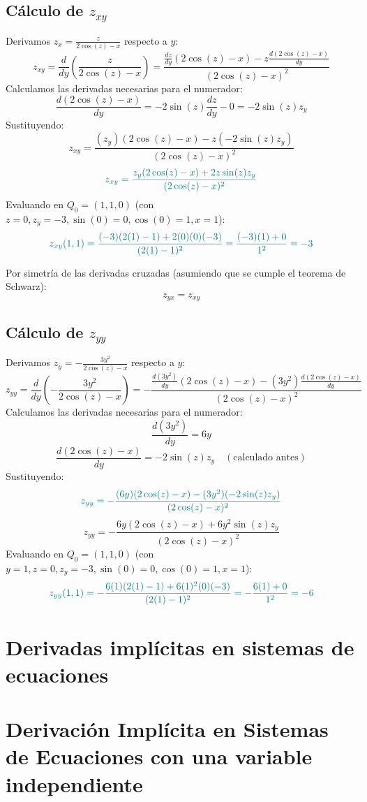 \documentclass{article}
\begin{document}
\subsection*{Cálculo de \( z_{xy} \)}
Derivamos \( z_x = \frac{z}{2\cos(z) - x} \) respecto a \( y \):
\[ z_{xy} = \frac{d}{dy}\left(\frac{z}{2\cos(z) - x}\right) = \frac{\frac{dz}{dy} (2\cos(z) - x) - z \frac{d(2\cos(z) - x)}{dy}}{(2\cos(z) - x)^2} \]
Calculamos las derivadas necesarias para el numerador:
\[ \frac{d(2\cos(z) - x)}{dy} = -2\sin(z) \frac{dz}{dy} - 0 = -2\sin(z) z_y \]
Sustituyendo:
\[ z_{xy} = \frac{(z_y)(2\cos(z) - x) - z(-2\sin(z) z_y)}{(2\cos(z) - x)^2} \]
\[\color{teal} z_{xy} = \frac{z_y(2\cos(z) - x) + 2z \sin(z) z_y}{(2\cos(z) - x)^2} \]
Evaluando en \( Q_0 = (1,1,0) \) (con \( z=0, z_y=-3, \sin(0)=0, \cos(0)=1, x=1 \)):
\[\color{teal} z_{xy}(1,1) = \frac{(-3)(2(1) - 1) + 2(0)(0)(-3)}{(2(1) - 1)^2} = \frac{(-3)(1) + 0}{1^2} = -3 \]


Por simetría de las derivadas cruzadas (asumiendo que se cumple el teorema de Schwarz):
\[
z_{yx} = z_{xy}
\]

\subsection*{Cálculo de \( z_{yy} \)}
Derivamos \( z_y = -\frac{3y^2}{2\cos(z) - x} \) respecto a \( y \):
\[ z_{yy} = \frac{d}{dy}\left(-\frac{3y^2}{2\cos(z) - x}\right) = - \frac{\frac{d(3y^2)}{dy} (2\cos(z) - x) - (3y^2) \frac{d(2\cos(z) - x)}{dy}}{(2\cos(z) - x)^2} \]
Calculamos las derivadas necesarias para el numerador:
\[ \frac{d(3y^2)}{dy} = 6y \]
\[ \frac{d(2\cos(z) - x)}{dy} = -2\sin(z) z_y \quad (\text{calculado antes}) \]
Sustituyendo:
\[\color{teal} z_{yy} = - \frac{(6y)(2\cos(z) - x) - (3y^2)(-2\sin(z) z_y)}{(2\cos(z) - x)^2} \]
\[ z_{yy} = - \frac{6y(2\cos(z) - x) + 6y^2 \sin(z) z_y}{(2\cos(z) - x)^2} \]
Evaluando en \( Q_0 = (1,1,0) \) (con \( y=1, z=0, z_y=-3, \sin(0)=0, \cos(0)=1, x=1 \)):
\[\color{teal} z_{yy}(1,1) = - \frac{6(1)(2(1) - 1) + 6(1)^2 (0) (-3)}{(2(1) - 1)^2} = - \frac{6(1) + 0}{1^2} = -6 \]

\newpage
\section{Derivadas implícitas en sistemas de ecuaciones}



\section*{Derivación Implícita en Sistemas de Ecuaciones con una variable independiente}
\end{document}
